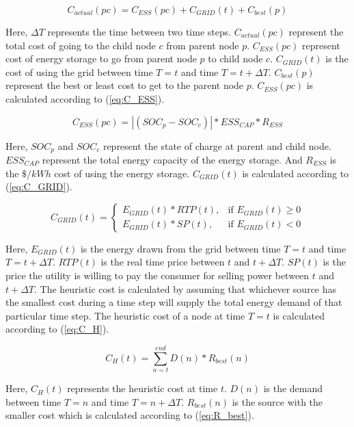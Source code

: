 \begin{equation}
\label{eq:C_actual}
    C_{actual}(pc) =  C_{ESS}(pc)+C_{GRID}(t)+C_{best}(p)
\end{equation}

Here, $\Delta T$ represents the time between two time steps. $C_{actual}(pc)$ represent the total cost of going to the child node $c$ from parent node $p$. $C_{ESS}(pc)$ represent cost of energy storage to go from parent node $p$ to child node $c$. $C_{GRID}(t)$ is the cost of using the grid between time $T=t$ and time $T=t+\Delta T$. $C_{best}(p)$ represent the best or least cost to get to the parent node $p$. $C_{ESS}(pc)$ is calculated according to (\ref{eq:C_ESS}).

\begin{equation}
\label{eq:C_ESS}
C_{ESS}(pc) = |(SOC_p - SOC_c)|*ESS_{CAP}*R_{ESS} 
\end{equation}

Here, $SOC_p$ and $SOC_c$ represent the state of charge at parent and child node. $ESS_{CAP}$ represent the total energy capacity of the energy storage. And $R_{ESS}$ is the $\$/kWh$ cost of using the energy storage. $C_{GRID}(t)$ is calculated according to (\ref{eq:C_GRID}).

\begin{equation}
\label{eq:C_GRID}
C_{GRID}(t) = 
\begin{cases}
   E_{GRID}(t)*RTP(t),& \text{if } E_{GRID}(t)\geq 0\\
    E_{GRID}(t)*SP(t),& \text{if }  E_{GRID}(t) < 0
\end{cases}
\end{equation}

Here, $E_{GRID}(t)$ is the energy drawn from the grid between time $T=t$ and time $T=t+\Delta T$. $RTP(t)$ is the real time price between $t$ and $t+\Delta T$. $SP(t)$ is the price the utility is willing to pay the consumer for selling power between $t$ and $t+\Delta T$. The heuristic cost is calculated by assuming that whichever source has the smallest cost during a time step will supply the total energy demand of that particular time step. The heuristic cost of a node at time $T = t$ is calculated according to (\ref{eq:C_H}).


\begin{equation}
\label{eq:C_H}
C_H(t) = \sum_{n=t}^{end} D(n)*R_{best}(n)
\end{equation}

Here, $C_H(t)$ represents the heuristic cost at time $t$. $D(n)$ is the demand between time $T = n$ and time $T = n+\Delta T$. $R_{best}(n)$ is the source with the smaller cost which is calculated according to (\ref{eq:R_best}).

